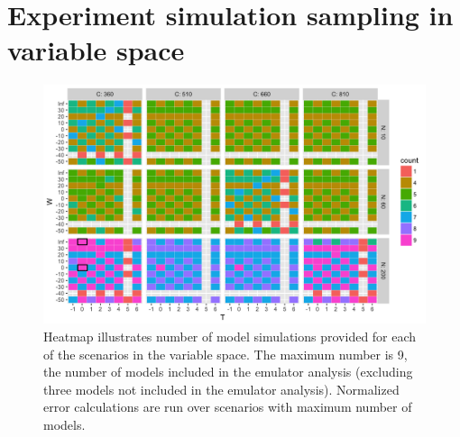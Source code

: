\documentclass[12pt]{article}
\begin{document}
{{\tableofcontents

\clearpage

\renewcommand{\thefigure}{S\arabic{figure}}

\section{Experiment simulation sampling in variable space}
\begin{figure}[h!]
  \centering
  \includegraphics[width=\textwidth]{s_how_many_simulations.png}
  \caption{
  Heatmap illustrates number of model simulations provided for each of the scenarios in the variable space. 
  The maximum number is 9, the number of models included in the emulator analysis (excluding three models not included in the emulator analysis). 
  Normalized error calculations are run over scenarios with maximum number of models.
  }
  \label{fig:numbersims}
\end{figure}

\clearpage
}}
\end{document}
